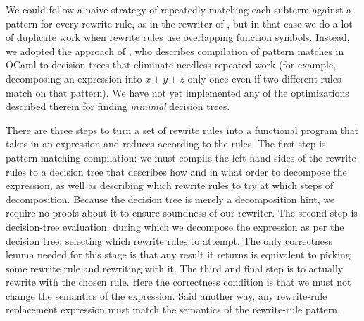 We could follow a naive strategy of repeatedly matching each subterm against a pattern for every rewrite rule, as in the rewriter of \textcite{rtac}, but in that case we do a lot of duplicate work when rewrite rules use overlapping function symbols.
Instead, we adopted the approach of \textcite{maranget2008compiling}, who describes compilation of pattern matches in OCaml to decision trees that eliminate needless repeated work (for example, decomposing an expression into $x + y + z$ only once even if two different rules match on that pattern).
We have not yet implemented any of the optimizations described therein for finding \emph{minimal} decision trees.

There are three steps to turn a set of rewrite rules into a functional program that takes in an expression and reduces according to the rules.
The first step is pattern-matching compilation: we must compile the left-hand sides of the rewrite rules to a decision tree that describes how and in what order to decompose the expression, as well as describing which rewrite rules to try at which steps of decomposition.
Because the decision tree is merely a decomposition hint, we require no proofs about it to ensure soundness of our rewriter.
The second step is decision-tree evaluation, during which we decompose the expression as per the decision tree, selecting which rewrite rules to attempt.
The only correctness lemma needed for this stage is that any result it returns is equivalent to picking some rewrite rule and rewriting with it.
The third and final step is to actually rewrite with the chosen rule.
Here the correctness condition is that we must not change the semantics of the expression.
Said another way, any rewrite-rule replacement expression must match the semantics of the rewrite-rule pattern.

